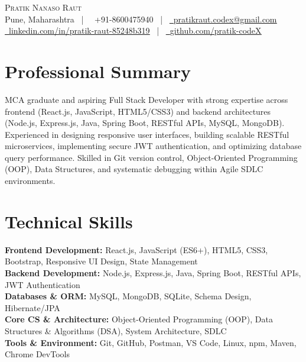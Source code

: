 \documentclass[letterpaper,10pt]{article}
\newcommand{\faPhone}{}
\newcommand{\faEnvelope}{}
\newcommand{\faLinkedin}{}
\newcommand{\faGithub}{}
\begin{document}
\begin{center}
    {\Huge \scshape Pratik Nanaso Raut} \\ \vspace{2pt}
    \small Pune, Maharashtra ~|~ 
    \faPhone\ +91-8600475940 ~|~ 
    \href{mailto:pratikraut.codex@gmail.com}{\faEnvelope\ \underline{pratikraut.codex@gmail.com}} \\ \vspace{2pt}
    \href{https://linkedin.com/in/pratik-raut-85248b319}{\faLinkedin\ \underline{linkedin.com/in/pratik-raut-85248b319}} ~|~ 
    \href{https://github.com/pratik-codeX}{\faGithub\ \underline{github.com/pratik-codeX}}
\end{center}

\vspace{-6pt}

\section{Professional Summary}
MCA graduate and aspiring Full Stack Developer with strong expertise across frontend (React.js, JavaScript, HTML5/CSS3) and backend architectures (Node.js, Express.js, Java, Spring Boot, RESTful APIs, MySQL, MongoDB). Experienced in designing responsive user interfaces, building scalable RESTful microservices, implementing secure JWT authentication, and optimizing database query performance. Skilled in Git version control, Object-Oriented Programming (OOP), Data Structures, and systematic debugging within Agile SDLC environments.

\section{Technical Skills}
\vspace{1pt}
\textbf{Frontend Development:} React.js, JavaScript (ES6+), HTML5, CSS3, Bootstrap, Responsive UI Design, State Management \\[1.5pt]
\textbf{Backend Development:} Node.js, Express.js, Java, Spring Boot, RESTful APIs, JWT Authentication \\[1.5pt]
\textbf{Databases \& ORM:} MySQL, MongoDB, SQLite, Schema Design, Hibernate/JPA \\[1.5pt]
\textbf{Core CS \& Architecture:} Object-Oriented Programming (OOP), Data Structures \& Algorithms (DSA), System Architecture, SDLC \\[1.5pt]
\textbf{Tools \& Environment:} Git, GitHub, Postman, VS Code, Linux, npm, Maven, Chrome DevTools
\vspace{-2pt}
\end{document}
